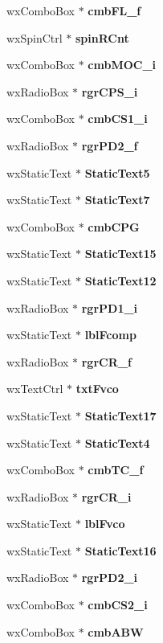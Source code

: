 \begin{DoxyCompactItemize}
\item 
wx\+Combo\+Box $\ast$ {\bf cmb\+F\+L\+\_\+f}
\item 
wx\+Spin\+Ctrl $\ast$ {\bf spin\+R\+Cnt}
\item 
wx\+Combo\+Box $\ast$ {\bf cmb\+M\+O\+C\+\_\+i}
\item 
wx\+Radio\+Box $\ast$ {\bf rgr\+C\+P\+S\+\_\+i}
\item 
wx\+Combo\+Box $\ast$ {\bf cmb\+C\+S1\+\_\+i}
\item 
wx\+Radio\+Box $\ast$ {\bf rgr\+P\+D2\+\_\+f}
\item 
wx\+Static\+Text $\ast$ {\bf Static\+Text5}
\item 
wx\+Static\+Text $\ast$ {\bf Static\+Text7}
\item 
wx\+Combo\+Box $\ast$ {\bf cmb\+C\+PG}
\item 
wx\+Static\+Text $\ast$ {\bf Static\+Text15}
\item 
wx\+Static\+Text $\ast$ {\bf Static\+Text12}
\item 
wx\+Radio\+Box $\ast$ {\bf rgr\+P\+D1\+\_\+i}
\item 
wx\+Static\+Text $\ast$ {\bf lbl\+Fcomp}
\item 
wx\+Radio\+Box $\ast$ {\bf rgr\+C\+R\+\_\+f}
\item 
wx\+Text\+Ctrl $\ast$ {\bf txt\+Fvco}
\item 
wx\+Static\+Text $\ast$ {\bf Static\+Text17}
\item 
wx\+Static\+Text $\ast$ {\bf Static\+Text4}
\item 
wx\+Combo\+Box $\ast$ {\bf cmb\+T\+C\+\_\+f}
\item 
wx\+Radio\+Box $\ast$ {\bf rgr\+C\+R\+\_\+i}
\item 
wx\+Static\+Text $\ast$ {\bf lbl\+Fvco}
\item 
wx\+Static\+Text $\ast$ {\bf Static\+Text16}
\item 
wx\+Radio\+Box $\ast$ {\bf rgr\+P\+D2\+\_\+i}
\item 
wx\+Combo\+Box $\ast$ {\bf cmb\+C\+S2\+\_\+i}
\item 
wx\+Combo\+Box $\ast$ {\bf cmb\+A\+BW}
\end{DoxyCompactItemize}
